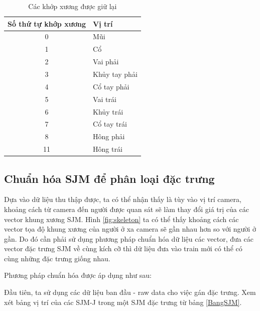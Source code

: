 \FloatBarrier
\begin{table}[h]
\caption{Các khớp xương được giữ lại}
\label{table:joints_choose}
\centering
\begin{center}
\begin{tabular}{|c|p{9cm}|} 
 \hline
Số thứ tự khớp xương  & Vị trí \\
 \hline
 0 & Mũi\\
 \hline 
 1 & Cổ\\
 \hline 
 2 & Vai phải\\
 \hline
 3 & Khủy tay phải \\
 \hline 
 4 & Cổ tay phải\\
 \hline
 5 & Vai trái\\
 \hline
 6 & Khủy trái\\
 \hline
 7 & Cổ tay trái\\
 \hline
 8 & Hông phải\\
 \hline
 11 & Hông trái\\
 \hline
\end{tabular}
\end{center}
\end{table}
\FloatBarrier

\subsection{Chuẩn hóa SJM để phân loại đặc trưng}

Dựa vào dữ liệu thu thập được, ta có thể nhận thấy là tùy vào vị trí camera, khoảng cách từ camera đến người được quan sát sẽ làm thay đổi giá trị của các vector khung xương SJM. Hình \ref{fig:skeleton} ta có thể thấy khoảng cách các vector tọa độ khung xương của người ở xa camera sẽ gần nhau hơn so với người ở gần. Do đó cần phải sử dụng phương pháp chuẩn hóa dữ liệu các vector, đưa các vector đặc trưng SJM về cùng kích cỡ thì dữ liệu đưa vào train mới có thể có cùng những đặc trưng giống nhau.

Phương pháp chuẩn hóa được áp dụng như sau:


Đầu tiên, ta sử dụng các dữ liệu ban đầu - raw data cho việc gán đặc trưng. Xem xét bảng vị trí của các SJM-J trong một SJM đặc trưng từ bảng \ref{BangSJM}.

